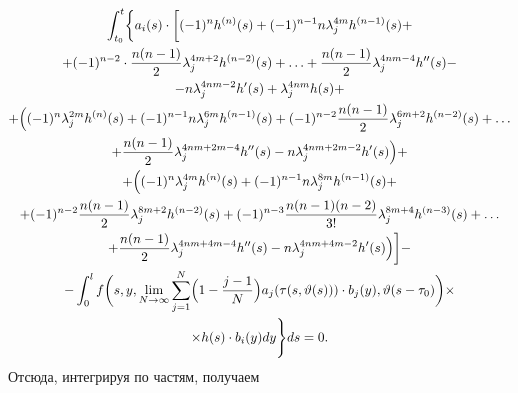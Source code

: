 \begin{multline*}
\int_{t_0}^t \biggl\{ a_i (s)\cdot \biggl[(-1)^n  h^{(n)}(s) + (-1)^{ n-1}n \lambda_j^{4 m}
h^{(n-1)}(s)+ 
\\
+ 
(-1)^{n-2} \cdot \frac{n (n-1)}{2} \lambda _j^{4 m+2}h^{(n-2)}(s)+ \ldots +
\frac{n (n-1)}{2} \lambda _j^{ 4 n m-4}  h ''(s)-  \\ - n \lambda _j^{4 n m-2}  h '(s)+\lambda_j^{4 n m}  h (s)+ 
\\
+ \Bigl( (-1)^n \lambda_j^{2 m} h^{(n)}(s)+ ( -1)^{n-1} n \lambda_j^{ 6 m}  h^{ (n-1)}(s)+ 
(-1)^{ n-2}\frac{n (n-1)}{2} \lambda_j^{ 6 m+2}  h^{ (n-2)}(s)+ \ldots %
\\
 + \frac{n (n-1)}{2} \lambda _j^{4 n m+2 m-4} h''(s)-n\lambda_j^{4 n  m+2 m-2}  h '(s) \Bigr)+ 
\\
+ \Bigl( ( -1)^n \lambda_j^{ 4 m} h^{(n)}(s)+ ( -1)^{n-1} n \lambda_j^{ 8 m}  h^{ (n-1)}(s)+ 
\\
+ ( -1)^{ n-2}\frac{n (n-1)}{2} \lambda _j^{ 8 m+2}  h^{(n-2)}(s)+( -1)^{ n-3} \frac{n (n-1) (n-2)}{3!} \lambda _j^{ 8 m+4}
 h^{ (n-3)}(s) + \ldots
 \\
 + \frac{n (n-1)}{2} \lambda_j^{ 4 n  m+4 m-4}  h ''(s)-n\lambda _j^{4 n  m+4 m-2}
h '(s) \Bigr) \biggr]-
\\
 -\int_0^l f  \biggl( s , y , \lim \limits_{N\to \infty } \sum\limits_{j =1}^N \Bigl( 1-\frac{j-1}{N}\Bigr) a_j ( \tau (s , \vartheta  (s)))\cdot b_j (y) , \vartheta  (s-\tau _0 )\biggr) \times 
\\
\times h (s)\cdot b_i (y) d y \Bigg\}  ds=0.
\end{multline*}
Отсюда, интегрируя по частям, получаем
